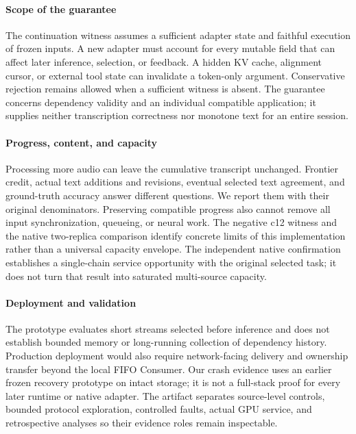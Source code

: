 \paragraph{Scope of the guarantee}
The continuation witness assumes a sufficient adapter state and faithful
execution of frozen inputs. A new adapter must account for every mutable
field that can affect later inference, selection, or feedback. A hidden
KV cache, alignment cursor, or external tool state can invalidate a
token-only argument. Conservative rejection remains allowed when a
sufficient witness is absent. The guarantee concerns dependency validity
and an individual compatible application; it supplies neither transcription
correctness nor monotone text for an entire session.

\paragraph{Progress, content, and capacity}
Processing more audio can leave the cumulative transcript unchanged.
Frontier credit, actual text additions and revisions, eventual selected
text agreement, and ground-truth accuracy answer different questions. We
report them with their original denominators. Preserving compatible
progress also cannot remove all input synchronization, queueing, or neural
work. The negative c12 witness and the native two-replica comparison
identify concrete limits of this implementation rather than a universal
capacity envelope. The independent native confirmation establishes a
single-chain service opportunity with the original selected task; it
does not turn that result into saturated multi-source capacity.

\paragraph{Deployment and validation}
The prototype evaluates short streams selected before inference and does not
establish bounded memory or long-running collection of dependency history.
Production deployment would also require network-facing delivery and
ownership transfer beyond the local FIFO Consumer. Our crash evidence uses
an earlier frozen recovery prototype on intact storage; it is not a
full-stack proof for every later runtime or native adapter. The artifact
separates source-level controls, bounded protocol exploration, controlled
faults, actual GPU service, and retrospective analyses so their evidence
roles remain inspectable.
